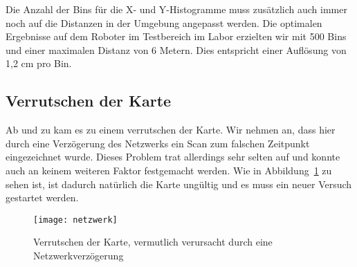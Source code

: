 Die Anzahl der Bins für die X- und Y-Histogramme muss zusätzlich auch immer noch auf die Distanzen in der Umgebung angepasst werden. Die optimalen Ergebnisse auf dem Roboter im Testbereich im Labor erzielten wir mit 500 Bins und einer maximalen Distanz von 6 Metern. Dies entspricht einer Auflösung von 1,2 cm pro Bin.

\subsection{Verrutschen der Karte}

Ab und zu kam es zu einem verrutschen der Karte. Wir nehmen an, dass hier durch eine Verzögerung des Netzwerks ein Scan zum falschen Zeitpunkt eingezeichnet wurde. Dieses Problem trat allerdings sehr selten auf und konnte auch an keinem weiteren Faktor festgemacht werden. Wie in Abbildung~\ref{fig:netzwerk} zu sehen ist, ist dadurch natürlich die Karte ungültig und es muss ein neuer Versuch gestartet werden.

\begin{figure}
	\centering
	\texttt{[image: netzwerk]}
	\caption{Verrutschen der Karte, vermutlich verursacht durch eine Netzwerkverzögerung}
	\label{fig:netzwerk}
\end{figure}